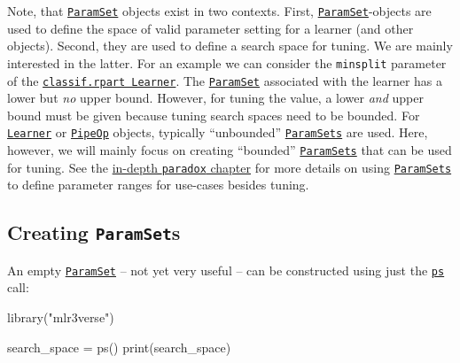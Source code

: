 \documentclass[
]{scrbook}
\newenvironment{Shaded}{\begin{snugshade}}{\end{snugshade}}
\newcommand{\FunctionTok}[1]{\textcolor[rgb]{0.00,0.00,0.00}{#1}}
\newcommand{\NormalTok}[1]{#1}
\newcommand{\OtherTok}[1]{\textcolor[rgb]{0.56,0.35,0.01}{#1}}
\newcommand{\StringTok}[1]{\textcolor[rgb]{0.31,0.60,0.02}{#1}}
\renewenvironment{Shaded} {\begin{snugshade}\small} {\end{snugshade}}
\begin{document}
Note, that \href{https://paradox.mlr-org.com/reference/ParamSet.html}{\texttt{ParamSet}} objects exist in two contexts.
First, \href{https://paradox.mlr-org.com/reference/ParamSet.html}{\texttt{ParamSet}}-objects are used to define the space of valid parameter setting for a learner (and other objects).
Second, they are used to define a search space for tuning.
We are mainly interested in the latter.
For an example we can consider the \texttt{minsplit} parameter of the \href{https://mlr3.mlr-org.com/reference/mlr_learners_classif.rpart.html}{\texttt{classif.rpart\ Learner}}.
The \href{https://paradox.mlr-org.com/reference/ParamSet.html}{\texttt{ParamSet}} associated with the learner has a lower but \emph{no} upper bound.
However, for tuning the value, a lower \emph{and} upper bound must be given because tuning search spaces need to be bounded.
For \href{https://mlr3.mlr-org.com/reference/Learner.html}{\texttt{Learner}} or \href{https://mlr3pipelines.mlr-org.com/reference/PipeOp.html}{\texttt{PipeOp}} objects, typically ``unbounded'' \href{https://paradox.mlr-org.com/reference/ParamSet.html}{\texttt{ParamSets}} are used.
Here, however, we will mainly focus on creating ``bounded'' \href{https://paradox.mlr-org.com/reference/ParamSet.html}{\texttt{ParamSets}} that can be used for tuning.
See the \protect\hyperlink{paradox}{in-depth \texttt{paradox} chapter} for more details on using \href{https://paradox.mlr-org.com/reference/ParamSet.html}{\texttt{ParamSets}} to define parameter ranges for use-cases besides tuning.

\hypertarget{creating-paramsets}{%
\subsection{\texorpdfstring{Creating \texttt{ParamSet}s}{Creating ParamSets}}\label{creating-paramsets}}

An empty \href{https://paradox.mlr-org.com/reference/ParamSet.html}{\texttt{ParamSet}} -- not yet very useful -- can be constructed using just the \href{https://paradox.mlr-org.com/reference/ps.html}{\texttt{ps}} call:

\begin{Shaded}
\begin{Highlighting}[]
\FunctionTok{library}\NormalTok{(}\StringTok{"mlr3verse"}\NormalTok{)}

\NormalTok{search\_space }\OtherTok{=} \FunctionTok{ps}\NormalTok{()}
\FunctionTok{print}\NormalTok{(search\_space)}
\end{Highlighting}
\end{Shaded}
\end{document}
